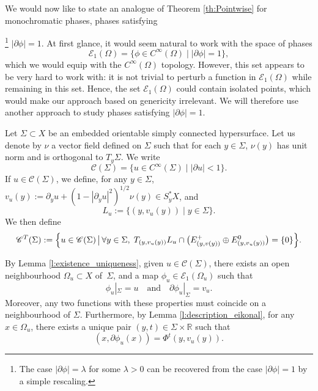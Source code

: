 \documentclass[JEP,XML,SOM,Unicode,published]{cedram}
\let\mathcal\mathscr
\let\sep\mid
\theoremstyle{plain}
\theoremstyle{definition}
\newcommand{\R}{\mathbb{R}}
\def\calC{\mathcal{C}}
\begin{document}
We would now like to state an analogue of Theorem \ref{th:Pointwise} for monochromatic phases, \ie phases satisfying{\footnote{The case $|\partial \phi|=\lambda$ for some $\lambda>0$ can be recovered from the case $|\partial \phi|=1$ by a simple rescaling.} $|\partial \phi|=1$. At first glance, it would seem natural to work with the space of phases
\[
\mathcal{E}_{1}(\Omega) = \{ \phi\in C^\infty(\Omega)\sep |\partial \phi |=1 \},
\]
which we would equip with the $C^\infty(\Omega)$ topology. However, this set appears to be very hard to work with: it is not trivial to perturb a function in $\mathcal{E}_{1}(\Omega)$ while remaining in this set. Hence, the set $\mathcal{E}_{1}(\Omega)$ could contain isolated points, which would make our approach based on genericity irrelevant. We will therefore use another approach to study phases satisfying $|\partial \phi|=1$.

Let $\Sigma\subset X$ be an embedded orientable simply connected hypersurface. Let us denote by $\nu$ a vector field defined on $\Sigma$ such that for each $y\in\Sigma$, $\nu(y)$ has unit norm and is orthogonal to $T_y\Sigma$. We write
\begin{equation}\label{eq:calC_def}
\calC(\Sigma)=\{u\in C^\infty(\Sigma)\sep |\partial u|<1\}.
\end{equation}
If $u\in \mathcal{C}(\Sigma)$, we define, for any $y\in \Sigma$, $v_u(y):=\partial _yu+(1-|\partial _yu|^2)^{1/2}\nu(y)\in S^*_y X$, and
\[
L_u:= \{ (y, v_u(y))\sep y\in \Sigma\}.
\]
We then define
\begin{equation}\label{eq:calC_trans}
\mathcal{C}^T(\Sigma) := \Bigl\{u \in \mathcal{C}(\Sigma)\, \big|\, \forall y \in \Sigma,\; T_{(y, v_u(y))}L_u \cap \bigl(E^+_{(y, v(y))} \oplus E^0_{(y, v_u(y))}\bigr) = \{0\} \Bigr\}.
\end{equation}

By Lemma \ref{l:existence_uniqueness}, given $u\in \mathcal{C}(\Sigma)$, there exists an open neighbourhood $\Omega_u\subset X$ of~$\Sigma$, and a map $\phi_u\in \mathcal{E}_1(\Omega_u)$ such that
\begin{equation}\label{eq:phi_from_u}
\phi_u|_\Sigma=u\quad\text{and}\quad\partial\phi_u|_\Sigma=v_u.
\end{equation}
Moreover, any two functions with these properties must coincide on a neighbourhood of $\Sigma$. Furthermore, by Lemma \ref{l:description_eikonal}, for any $x\in \Omega_u$, there exists a unique pair $(y,t)\in\Sigma \times \R$ such that\vspace*{-3pt}\enlargethispage{.5\baselineskip}%
\begin{equation}\label{eq:GradientsAreCool}
(x, \partial \phi_u(x)) = \Phi^t(y, v_u(y)).
\end{equation}

}
\end{document}
